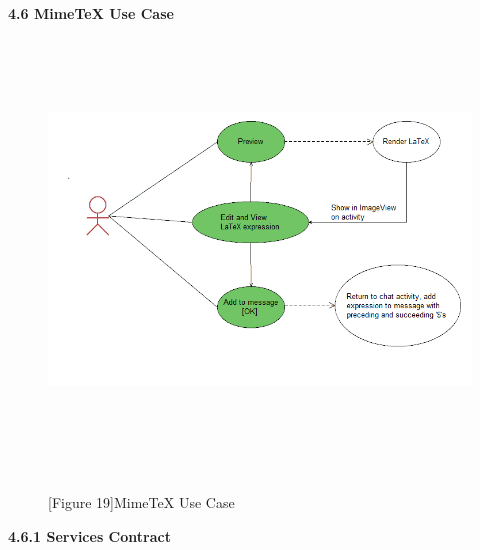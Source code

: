\documentclass[29pt,a4paper]{moderncv}
\begin{document}
\newpage		
	\left\textbf{4.6 MimeTeX Use Case}
		\begin{figure}
			\centering
			\\ \includegraphics[width=6.0in, height=4.0in]{./MimeTeXUseCase.png}
			\\\caption{[Figure 19]MimeTeX Use Case}\\
		\end{figure}
		\newpage
		\noindent\left\textbf{4.6.1 Services Contract}\\ 
\end{document}
